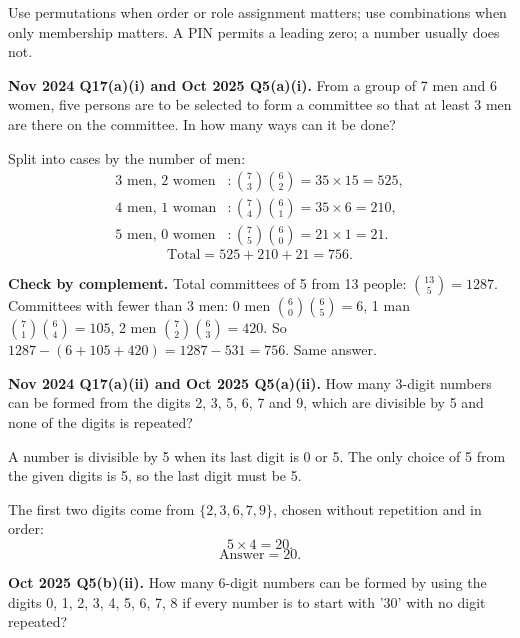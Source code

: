 \documentclass[11pt,a4paper]{article}
\begin{document}
\begin{dangerbox}
Use permutations when order or role assignment matters; use combinations when only membership matters. A PIN permits a leading zero; a number usually does not.
\end{dangerbox}

\begin{pyqbox}
\textbf{Nov 2024 Q17(a)(i) and Oct 2025 Q5(a)(i).} From a group of 7 men and 6 women, five persons are to be selected to form a committee so that at least 3 men are there on the committee. In how many ways can it be done?
\end{pyqbox}

\begin{solbox}
Split into cases by the number of men:
\[
\begin{aligned}
\text{3 men, 2 women} &: \binom73\binom62=35\times15=525,\\
\text{4 men, 1 woman} &: \binom74\binom61=35\times6=210,\\
\text{5 men, 0 women} &: \binom75\binom60=21\times1=21.
\end{aligned}
\]
\[
\text{Total}=525+210+21=\boxed{756}.
\]

\textbf{Check by complement.} Total committees of 5 from 13 people: $\binom{13}{5}=1287$. Committees with fewer than 3 men: 0 men $\binom60\binom65=6$, 1 man $\binom71\binom64=105$, 2 men $\binom72\binom63=420$. So $1287-(6+105+420)=1287-531=756$. Same answer.
\end{solbox}

\begin{pyqbox}
\textbf{Nov 2024 Q17(a)(ii) and Oct 2025 Q5(a)(ii).} How many 3-digit numbers can be formed from the digits 2, 3, 5, 6, 7 and 9, which are divisible by 5 and none of the digits is repeated?
\end{pyqbox}

\begin{solbox}
A number is divisible by 5 when its last digit is 0 or 5. The only choice of 5 from the given digits is 5, so the last digit must be 5.

The first two digits come from $\{2,3,6,7,9\}$, chosen without repetition and in order:
\[
5\times4=20.
\]
\[
\text{Answer}=\boxed{20}.
\]
\end{solbox}

\begin{pyqbox}
\textbf{Oct 2025 Q5(b)(ii).} How many 6-digit numbers can be formed by using the digits 0, 1, 2, 3, 4, 5, 6, 7, 8 if every number is to start with '30' with no digit repeated?
\end{pyqbox}
\end{document}
